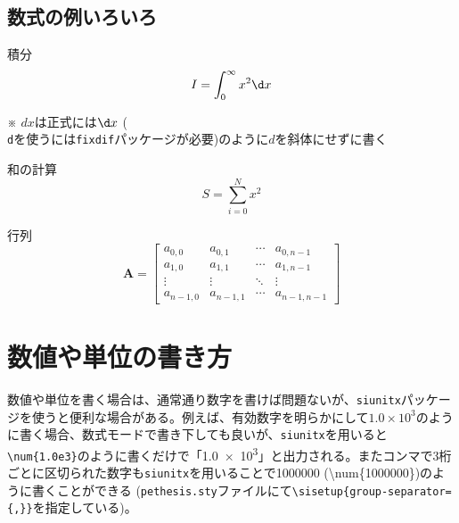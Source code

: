 \subsection{数式の例いろいろ}

\begin{titlebox}{積分}
  \adjustdisplayskips{1mm}
  \begin{equation}
    I = \int_0^{\infty} x^2 \d x
  \end{equation}
  \begin{center}
    ※ $dx$は正式には$\d x$ (\texttt{\\d}を使うには\texttt{fixdif}パッケージが必要)のように$d$を斜体にせずに書く
  \end{center}
\end{titlebox}

\begin{titlebox}{和の計算}
  \adjustdisplayskips{1mm}
  \begin{equation}
    S = \sum_{i=0}^N x^2
  \end{equation}
\end{titlebox}

\begin{titlebox}{行列}
  \adjustdisplayskips{1mm}
  \begin{equation}
    \mathbf{A} = \begin{bmatrix}
      a_{0,0}   & a_{0,1}   & \cdots & a_{0,n-1}   \\
      a_{1,0}   & a_{1,1}   & \cdots & a_{1,n-1}   \\
      \vdots    & \vdots    & \ddots & \vdots      \\
      a_{n-1,0} & a_{n-1,1} & \cdots & a_{n-1,n-1}
    \end{bmatrix}
  \end{equation}
\end{titlebox}

\section{数値や単位の書き方}
\label{sec:numbers-and-units}

数値や単位を書く場合は、通常通り数字を書けば問題ないが、\texttt{siunitx}パッケージを使うと便利な場合がある。例えば、有効数字を明らかにして$1.0 \times 10^3$のように書く場合、数式モードで書き下しても良いが、\texttt{siunitx}を用いると\texttt{\textbackslash num\{1.0e3\}}のように書くだけで「\num{1.0e3}」と出力される。またコンマで3桁ごとに区切られた数字も\texttt{siunitx}を用いることで\num{1000000} (\textbackslash num\{1000000\})のように書くことができる (\texttt{pethesis.sty}ファイルにて\texttt{\textbackslash sisetup\{group-separator=\{,\}\}}を指定している)。

